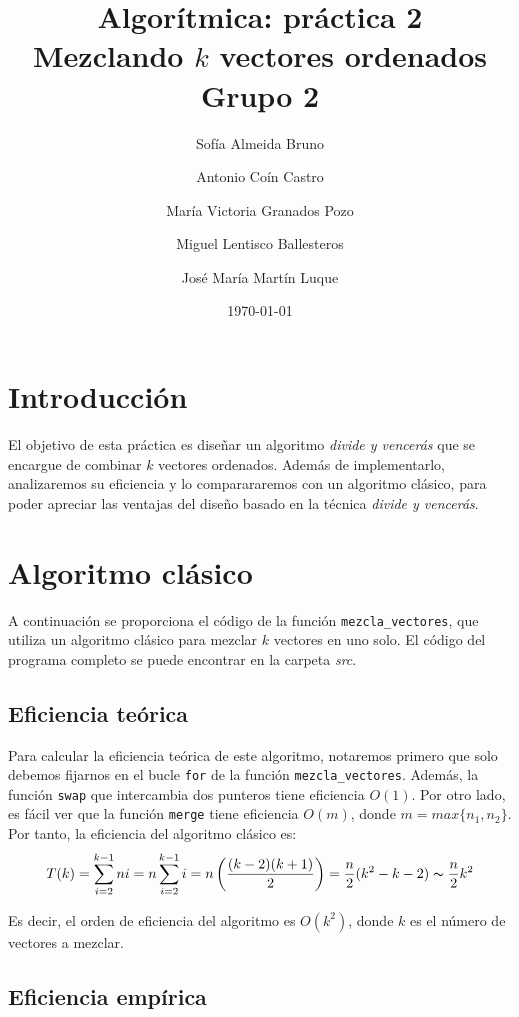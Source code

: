 \documentclass[11pt]{article}
\title{Algorítmica: práctica 2 \\ \large Mezclando $k$ vectores ordenados\\ \vspace{0.2em}Grupo 2}
\author{Sofía Almeida Bruno \and Antonio Coín Castro \and María Victoria Granados Pozo \and Miguel Lentisco Ballesteros \and José María Martín Luque}
\date{\today}
\begin{document}
\maketitle

\newpage

\section*{Introducción}

El objetivo de esta práctica es diseñar un algoritmo \textit{divide y vencerás}
que se encargue de combinar $k$ vectores ordenados. Además de implementarlo, analizaremos su eficiencia y lo comparararemos con un algoritmo clásico, para poder apreciar las ventajas del diseño basado en la técnica \textit{divide y vencerás}.

\section*{Algoritmo clásico}

A continuación se proporciona el código de la función \texttt{mezcla\_vectores},
que utiliza un algoritmo clásico para mezclar $k$ vectores en uno solo. El
código del programa completo se puede encontrar en la carpeta \textit{src}.\\



\subsection*{Eficiencia teórica}

Para calcular la eficiencia teórica de este algoritmo, notaremos primero que solo debemos fijarnos en el bucle \verb|for| de la función \verb|mezcla_vectores|. Además, la función \verb|swap| que intercambia dos punteros tiene eficiencia $O(1)$. Por otro lado, es fácil ver que la función \verb|merge| tiene eficiencia $O(m)$, donde $m = max\{n_1, n_2\}$. Por tanto, la eficiencia del algoritmo clásico es: $$T(k) = \sum_{i=2}^{k-1} ni = n \sum_{i=2}^{k-1} i = n \left( \frac{(k-2)(k+1)}{2} \right) = \frac{n}{2}(k^2 -k - 2) \thicksim \frac{n}{2}k^2$$

Es decir, el orden de eficiencia del algoritmo es $O(k^2)$, donde $k$ es el número de vectores a mezclar.

\subsection*{Eficiencia empírica}
\end{document}
